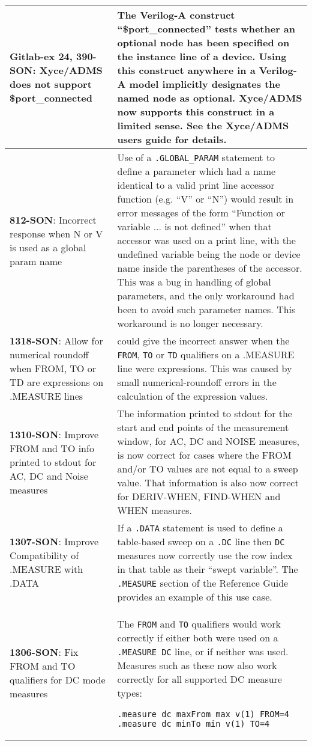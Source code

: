{\begin{longtable}[h] {>{\raggedright\small}m{2in}|>{\raggedright\let\\\tabularnewline\small}m{3.5in}}
\textbf{Gitlab-ex 24, 390-SON}: Xyce/ADMS does not support \$port\_connected &
The Verilog-A construct ``\$port\_connected'' tests whether an
optional node has been specified on the instance line of a device.
Using this construct anywhere in a Verilog-A model implicitly
designates the named node as optional.  Xyce/ADMS now supports this
construct in a limited sense.  See the Xyce/ADMS users guide for
details. \\ \hline

\textbf{812-SON}: Incorrect response when N or V is used as a global param name &
Use of a \texttt{.GLOBAL\_PARAM} statement to define a parameter which
had a name identical to a valid print line accessor function
(e.g. ``V'' or ``N'') would result in error messages of the form
``Function or variable ... is not defined'' when that accessor was
used on a print line, with the undefined variable being the node or
device name inside the parentheses of the accessor.  This was a bug in
handling of global parameters, and the only workaround had been to
avoid such parameter names.  This workaround is no longer
necessary. \\ \hline

\textbf{1318-SON}: Allow for numerical roundoff when FROM, TO or TD
are expressions on .MEASURE lines & \Xyce{} could give the incorrect
answer when the \texttt{FROM}, \texttt{TO} or \texttt{TD} qualifiers
on a .MEASURE line were expressions.  This was caused by small
numerical-roundoff errors in the calculation of the expression
values.
\\ \hline

\textbf{1310-SON}: Improve FROM and TO info printed to stdout for AC,
DC and Noise measures & The information printed to stdout for the
start and end points of the measurement window, for AC, DC and NOISE
measures, is now correct for cases where the FROM and/or TO values
are not equal to a sweep value.  That information is also now
correct for DERIV-WHEN, FIND-WHEN and WHEN measures.
\\ \hline

\textbf{1307-SON}: Improve Compatibility of .MEASURE with .DATA &
If a \texttt{.DATA} statement is used to define a table-based sweep
on a \texttt{.DC} line then \texttt{DC} measures now correctly use
the row index in that table as their ``swept variable''.  The
\texttt{.MEASURE} section of the \Xyce{} Reference Guide provides
an example of this use case.
\\ \hline

\textbf{1306-SON}: Fix FROM and TO qualifiers for DC mode measures &
The \texttt{FROM} and \texttt{TO} qualifiers would work correctly if
either both were used on a \texttt{.MEASURE DC} line, or if neither
was used.  Measures such as these now also work correctly for all
supported DC measure types:
\begin{verbatim}
.measure dc maxFrom max v(1) FROM=4
.measure dc minTo min v(1) TO=4
\end{verbatim}
\\ \hline


\end{longtable}}
